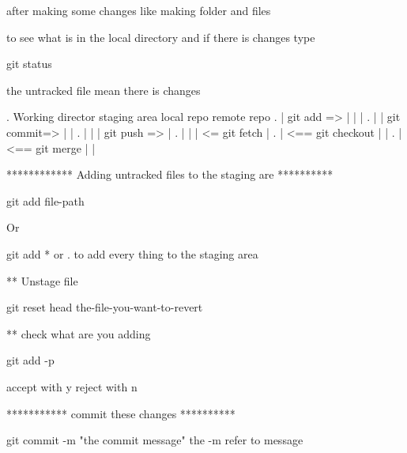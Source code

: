 after making some changes like making folder and files 

to see what is in the local directory and if there is changes type 

git status 

the untracked file mean there is changes 

. Working director       staging area      local repo        remote repo 
.        |   git add =>        |                |                  |
.        |                     | git commit=>   |                  |
.        |                     |                |   git push =>    |         
.        |                     |                |   <= git fetch   |
.        |              <== git checkout        |                  |
.        |               <==  git merge         |                  |


************  Adding untracked files to the staging are **********

git add file-path 

Or  

git add *   or .   to add every thing to the staging area 

** Unstage file  

git reset head the-file-you-want-to-revert

** check what are you adding 

git add -p 

accept with y  reject with n 

*********** commit these changes **********

git commit -m "the commit message"
  the -m refer to message   